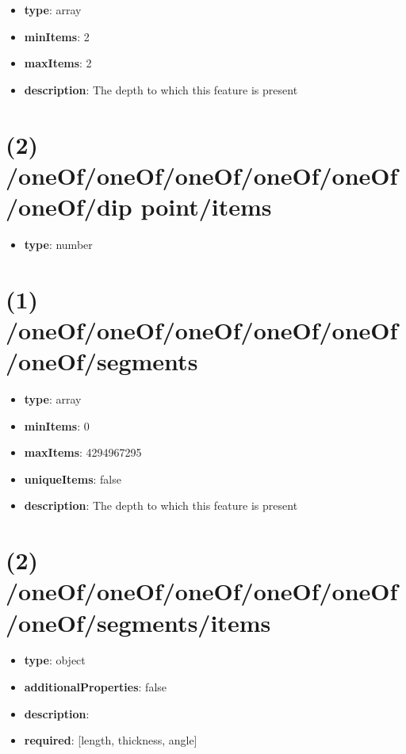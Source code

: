 \begin{itemize}[leftmargin=1em]\item {\bf type}: array
\item {\bf minItems}: 2
\item {\bf maxItems}: 2
\item {\bf description}: The depth to which this feature is present
\end{itemize}\section{(2) /oneOf/oneOf/oneOf/oneOf/oneOf/oneOf/dip point/items}
\begin{itemize}[leftmargin=2em]\item {\bf type}: number
\end{itemize}\section{(1) /oneOf/oneOf/oneOf/oneOf/oneOf/oneOf/segments}
\begin{itemize}[leftmargin=1em]\item {\bf type}: array
\item {\bf minItems}: 0
\item {\bf maxItems}: 4294967295
\item {\bf uniqueItems}: false
\item {\bf description}: The depth to which this feature is present
\end{itemize}\section{(2) /oneOf/oneOf/oneOf/oneOf/oneOf/oneOf/segments/items}
\begin{itemize}[leftmargin=2em]\item {\bf type}: object
\item {\bf additionalProperties}: false
\item {\bf description}: 
\item {\bf required}: [length, thickness, angle]\end{itemize}
